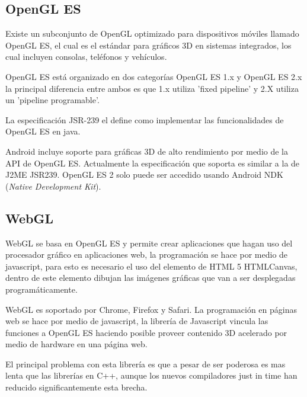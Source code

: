 \documentclass[12pt,a4paper,spanish,openany]{book}
\begin{document}
\subsection{OpenGL ES}
Existe un subconjunto de OpenGL optimizado para dispositivos móviles llamado
OpenGL ES,  el cual es el estándar para gráficos 3D en sistemas integrados,
los cual incluyen consolas, teléfonos y vehículos. \cite{kronos}

OpenGL ES está organizado en dos categorías OpenGL ES 1.x y OpenGL ES 2.x la
principal diferencia entre ambos es que 1.x utiliza 'fixed pipeline' y 2.X
utiliza un 'pipeline programable'.

La especificación JSR-239 el define como implementar las funcionalidades de
OpenGL ES en java.

Android incluye soporte para gráficas 3D de alto rendimiento por medio de
la API de OpenGL ES. Actualmente la especificación que soporta es similar a la
de J2ME JSR239.\cite{openglAnd} OpenGL ES 2  solo puede ser accedido usando
Android NDK (\emph{Native Development Kit}).

\subsection{WebGL}

WebGL se basa en OpenGL ES y permite crear aplicaciones que hagan uso del
procesador gráfico en aplicaciones web, la programación se hace por medio de
javascript, para esto es necesario el uso del elemento de HTML 5 HTMLCanvas,
dentro de este elemento dibujan las imágenes gráficas que van a ser
desplegadas programáticamente.

WebGL es soportado por Chrome, Firefox y Safari. La programación en páginas web
se hace por medio de javascript, la librería de Javascript vincula las funciones a OpenGL ES haciendo posible proveer contenido
3D acelerado por medio de hardware en una página web.

El principal problema con esta librería es que a pesar de ser poderosa es mas
lenta que las librerías en C++, aunque los nuevos compiladores just in
time han reducido significantemente esta brecha. \cite{1772933}

\end{document}
